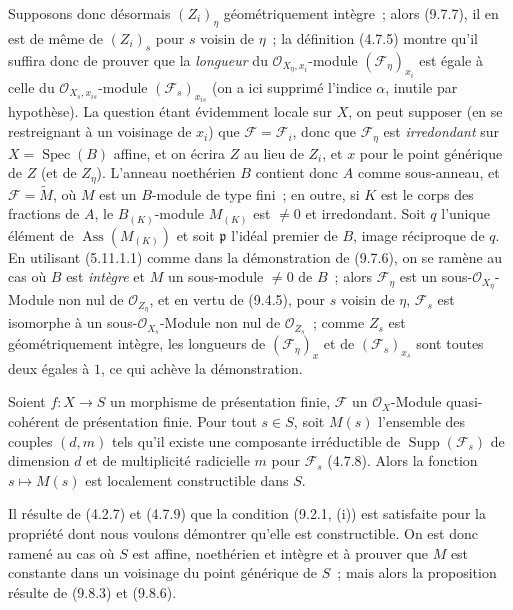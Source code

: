 Supposons donc désormais $(Z_i)_\eta$ géométriquement intègre~; alors (9.7.7),
il en est de même de $(Z_i)_s$ pour $s$ voisin de $\eta$~; la définition (4.7.5)
montre qu'il suffira donc de prouver que la \emph{longueur} du
$\mathcal O_{X_\eta,x_i}$-module $(\mathcal F_\eta)_{x_i}$ est égale à celle du
$\mathcal O_{X_s,x_{is}}$-module $(\mathcal F_s)_{x_{is}}$ (on a ici supprimé
l'indice $\alpha$, inutile par hypothèse). La question étant évidemment locale
sur $X$, on peut supposer (en se restreignant à un voisinage de $x_i$) que
$\mathcal F=\mathcal F_i$, donc que $\mathcal F_\eta$ est \emph{irredondant} sur
$X=\operatorname{Spec}(B)$ affine, et on écrira $Z$ au lieu de $Z_i$, et $x$
pour le point générique de $Z$ (et de $Z_\eta$). L'anneau noethérien $B$
contient donc $A$ comme sous-anneau, et $\mathcal F=\widetilde M$, où $M$ est un
$B$-module de type fini~; en outre, si $K$ est le corps des fractions de $A$,
le $B_{(K)}$-module $M_{(K)}$ est $\neq0$ et irredondant. Soit $q$ l'unique
élément de $\operatorname{Ass}(M_{(K)})$ et soit $\mathfrak p$ l'idéal premier
de $B$, image réciproque de $q$. En utilisant (5.11.1.1) comme dans la
démonstration de (9.7.6), on se ramène au cas où $B$ est \emph{intègre} et $M$
un sous-module $\neq0$ de $B$~; alors $\mathcal F_\eta$ est un
sous-$\mathcal O_{X_\eta}$-Module non nul de $\mathcal O_{Z_\eta}$, et en vertu
de (9.4.5), pour $s$ voisin de $\eta$, $\mathcal F_s$ est isomorphe à un
sous-$\mathcal O_{X_s}$-Module non nul de $\mathcal O_{Z_s}$~; comme $Z_s$ est
géométriquement intègre, les longueurs de $(\mathcal F_\eta)_x$ et de
$(\mathcal F_s)_{x_s}$ sont toutes deux égales à $1$, ce qui achève la
démonstration.


\begin{corollary}[9.8.7]
\label{IV.9.8.7-fr}
Soient $f:X\to S$ un morphisme de présentation finie, $\mathcal F$ un
$\mathcal O_X$-Module quasi-cohérent de présentation finie. Pour tout $s\in S$,
soit $M(s)$ l'ensemble des couples $(d,m)$ tels qu'il existe une composante
irréductible de $\operatorname{Supp}(\mathcal F_s)$ de dimension $d$ et de
multiplicité radicielle $m$ pour $\mathcal F_s$ (4.7.8). Alors la fonction
$s\mapsto M(s)$ est localement constructible dans $S$.
\end{corollary}

Il résulte de (4.2.7) et (4.7.9) que la condition (9.2.1, (i)) est satisfaite
pour la propriété dont nous voulons démontrer qu'elle est constructible. On est
donc ramené au cas où $S$ est affine, noethérien et intègre et à prouver que $M$
est constante dans un voisinage du point générique de $S$~; mais alors la
proposition résulte de (9.8.3) et (9.8.6).

